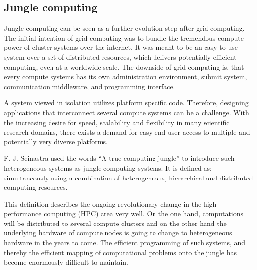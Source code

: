 \subsection{Jungle computing}
\label{sec:jungle}
Jungle computing can be seen as a further evolution step after grid
computing. The initial intention of grid computing was to
bundle the tremendous compute power of cluster systems over the
internet\cite{ref:grid}. It was meant to be an easy to use system over a
set of distributed resources, which delivers potentially efficient
computing, even at a worldwide scale.  The downside of grid computing
is, that every compute systems has its own administration environment,
submit system, communication middleware, and programming interface.

A system viewed in isolation utilizes platform specific
code. Therefore, designing applications that interconnect several
compute systems can be a challenge.  With the increasing desire for
speed, scalability and flexibility in many scientific research
domains, there exists a demand for easy end-user access to multiple
and potentially very diverse platforms.

F. J. Seinastra used the words ``A true computing jungle''
to introduce such heterogeneous systems as jungle computing
systems\cite{ref:jungle}. It is defined as: simultaneously using a
combination of heterogeneous, hierarchical and distributed computing
resources.

This definition describes the ongoing revolutionary change in the high
performance computing (HPC) area very well. On the one hand,
computations will be distributed to several compute clusters and on
the other hand the underlying hardware of compute nodes is going to
change to heterogeneous hardware in the years to come. The efficient
programming of such systems, and thereby the efficient mapping of
computational problems onto the jungle has become enormously difficult
to maintain.


